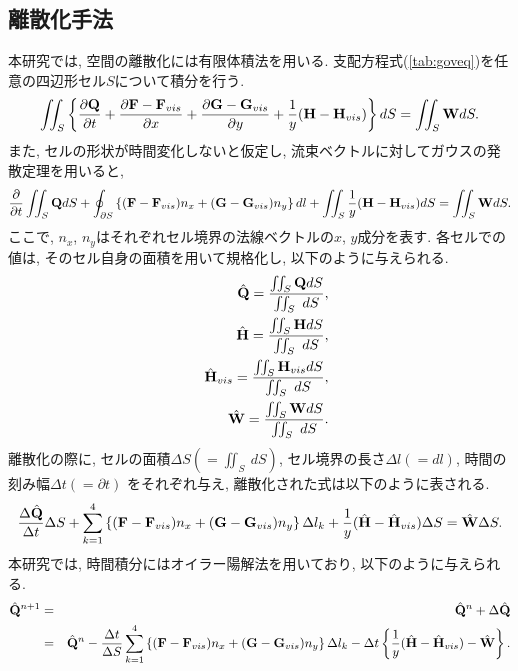 \subsection{離散化手法}

本研究では,
空間の離散化には有限体積法を用いる.
支配方程式(\ref{tab:goveq})を任意の四辺形セル$S$について積分を行う.
\begin{equation}
\iint_{S} \left\{ \frac{\partial {\bf Q}}{\partial t}+\frac{\partial {\bf F}-{\bf F}_{vis}}{\partial x}+\frac{\partial {\bf G}-{\bf G}_{vis}}{\partial y}+\frac{1}{y}({\bf H}-{\bf H}_{vis}) \right\} dS = \iint _{S}{\bf W}dS. 
\end{equation}
また,
セルの形状が時間変化しないと仮定し,
流束ベクトルに対してガウスの発散定理を用いると,
\begin{equation}
\frac{\partial}{\partial t} \iint _{S}{\bf Q}dS+\oint_{\partial S} \left\{ ({\bf F}-{\bf F}_{vis})n_{x}+({\bf G}-{\bf G}_{vis})n_{y}\right\}dl+\iint_{S}\frac{1}{y}({\bf H}-{\bf H}_{vis})dS = \iint _{S}{\bf W}dS. 
\end{equation}
ここで,
$n_{x}$, $n_{y}$はそれぞれセル境界の法線ベクトルの$x$, $y$成分を表す.
各セルでの値は,
そのセル自身の面積を用いて規格化し,
以下のように与えられる.
\begin{eqnarray}
&&{\hat {\bf Q}}=\frac{\iint_S{\bf Q}dS}{\iint_S~dS},\\
&&{\hat {\bf H}}=\frac{\iint_S{\bf H}dS}{\iint_S~dS},\\
&&{\hat {\bf H}}_{vis}=\frac{\iint_S{\bf H}_{vis}dS}{\iint_S~dS},\\
&&{\hat {\bf W}}=\frac{\iint_S{\bf W}dS}{\iint_S~dS}.
\end{eqnarray}
離散化の際に,
セルの面積$\Delta S(={\iint_S~dS})$,
セル境界の長さ$\Delta l(=dl)$,
時間の刻み幅$\Delta t(=\partial t)$
をそれぞれ与え,
離散化された式は以下のように表される.
\begin{equation}
\frac{\Delta {\hat {\bf Q}}}{\Delta t}\Delta S+\sum^{4}_{k=1} \left\{ ({\bf F}-{\bf F}_{vis})n_{x}+({\bf G}-{\bf G}_{vis})n_{y}\right\} \Delta l_{k}+\frac{1}{y}({\hat {\bf H}}-{\hat {\bf H}}_{vis})\Delta S = {\hat {\bf W}}\Delta S. 
\end{equation}
本研究では,
時間積分にはオイラー陽解法を用いており,
以下のように与えられる.
\begin{eqnarray}
{\hat {\bf Q}}^{n+1}&=&{\hat {\bf Q}}^{n}+\Delta{\hat {\bf Q}} \nonumber\\
                    &=&{\hat {\bf Q}}^{n}-\frac{\Delta t}{\Delta S}\sum^{4}_{k=1} \left\{ ({\bf F}-{\bf F}_{vis})n_{x}+({\bf G}-{\bf G}_{vis})n_{y}\right\} \Delta l_{k}-{\Delta t} \left\{ \frac{1}{y}({\hat {\bf H}}-{\hat {\bf H}}_{vis})-{\hat {\bf W}} \right\}\nonumber.\\ 
\end{eqnarray}

